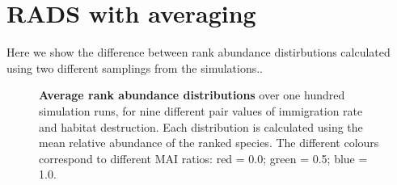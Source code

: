 
\section{RADS with averaging}

Here we show the difference between rank abundance distirbutions calculated using two different samplings from the simulations..

\begin{figure}[hp!]
	\centering
        \caption{\textbf{Average rank abundance distributions} over one hundred simulation runs, for nine different pair values of immigration rate and habitat destruction. Each distribution is calculated using the mean relative abundance of the ranked species. The different colours correspond to different MAI ratios: red = 0.0; green = 0.5; blue = 1.0.}    
\end{figure}


